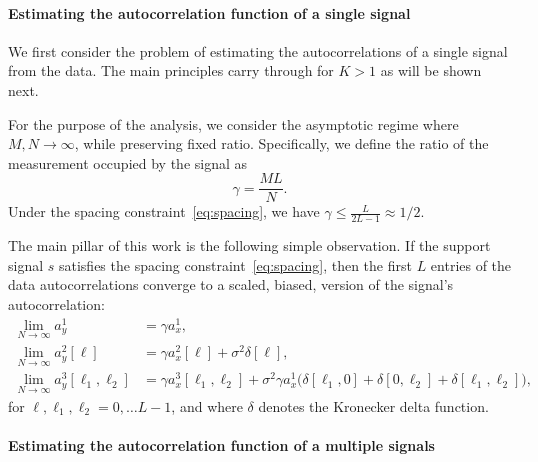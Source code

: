 \documentclass[english,11pt]{article}
\numberwithin{equation}{section}
\theoremstyle{plain}
\theoremstyle{definition}
\theoremstyle{remark}
\theoremstyle{plain}
\theoremstyle{remark}
\theoremstyle{plain}
\theoremstyle{plain}
\begin{document}
\paragraph{Estimating the autocorrelation function of a single signal}

We first consider the problem of estimating the autocorrelations of a single signal from the data. 
The main principles carry through for $K>1$ as will be shown next.  

For the purpose of the analysis, we consider  the asymptotic regime where $M,N\to\infty$, while preserving fixed ratio. 
Specifically, we define the ratio of the measurement occupied by  the signal as
\begin{equation}
\gamma = \frac{M L}{N}.
\end{equation}
Under the spacing constraint~\eqref{eq:spacing}, we have $\gamma\leq\frac{L}{2L-1}\approx 1/2$.

The main pillar of this work is the following simple observation.
If the support signal $s$ satisfies the spacing constraint~\eqref{eq:spacing}, then the first $L$ entries of the data autocorrelations converge 
to a scaled, biased, version of the signal's autocorrelation:
\begin{align} 
\lim_{N\to\infty} a_y^1 & = \gamma a_{x}^1, \nonumber\\
\lim_{N\to\infty} a_y^2[\ell] & = \gamma a_{x}^2[\ell] +\sigma^2\delta[\ell], \label{eq:data_ac_k1} \\
\lim_{N\to\infty} a_y^3[\ell_1,\ell_2] & = \gamma a_{x}^3[\ell_1,\ell_2] + \sigma^2\gamma a_{x}^1 \big(\delta[\ell_1,0]+\delta[0,\ell_2]+\delta[\ell_1,\ell_2]\big), \nonumber
\end{align}
for $\ell,\ell_1,\ell_2=0,\ldots L-1$, and where $\delta$ denotes the Kronecker delta function. 

\paragraph{Estimating the autocorrelation function of a multiple signals}
\end{document}
